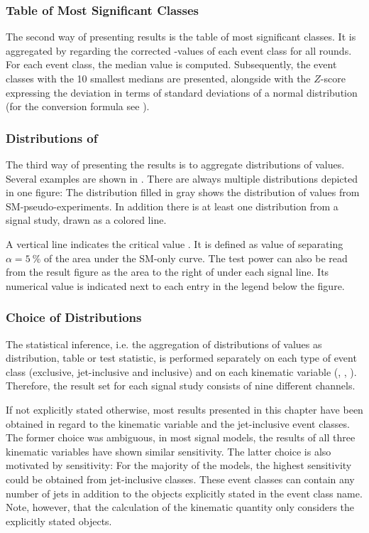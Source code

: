 \subsubsection{Table of Most Significant Classes}
The second way of presenting results is the table of most significant classes. It is aggregated by regarding the corrected \ptilde-values of each event class for all rounds. For each event class, the median \ptilde value is computed. Subsequently, the event classes with the \num{10} smallest medians are presented, alongside with the $Z$-score expressing the deviation in terms of standard deviations of a normal distribution (for the conversion formula see ). 

\subsubsection{Distributions of \TSphat}
The third way of presenting the results is to aggregate distributions of \TSphat values. Several examples are shown in . There are always multiple distributions depicted in one figure: The distribution filled in gray shows the distribution of \TSphat values from \ac{SM}-pseudo-experiments. In addition there is at least one distribution from a signal study, drawn as a colored line. 

A vertical line indicates the critical value \TSphatcrit. It is defined as value of \TSphat separating $\alpha = \SI{5}{\percent}$ of the area under the \ac{SM}-only curve. The test power can also be read from the result figure as the area to the right of \TSphatcrit under each signal line. Its numerical value is indicated next to each entry in the legend below the figure.

\subsubsection{Choice of Distributions}
The statistical inference, i.e. the aggregation of distributions of \ptilde values as distribution, table or test statistic, is performed separately on each type of event class (exclusive, jet-inclusive and inclusive) and on each kinematic variable (\Minv, \sumpT, \MET). Therefore, the result set for each signal study consists of nine different channels.

If not explicitly stated otherwise, most results presented in this chapter have been obtained in regard to the \sumpT kinematic variable and the jet-inclusive event classes. The former choice was ambiguous, in most signal models, the results of all three kinematic variables have shown similar sensitivity. 
The latter choice is also motivated by sensitivity: For the majority of the models, the highest sensitivity could be obtained from jet-inclusive classes. These event classes can contain any number of jets in addition to the objects explicitly stated in the event class name. Note, however, that the calculation of the kinematic quantity only considers the explicitly stated objects.

